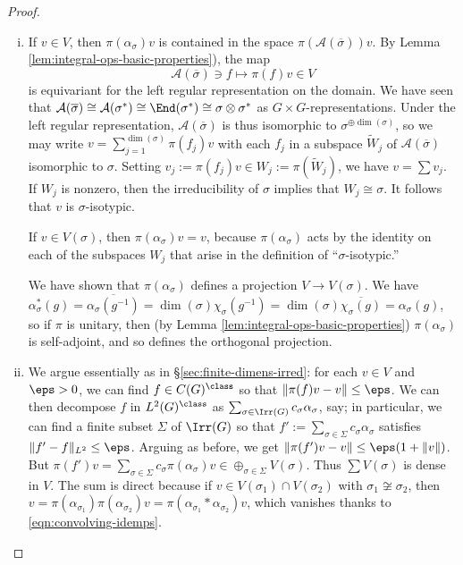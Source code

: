 \documentclass[reqno]{amsart} 
\begin{document}
\begin{proof}
  \begin{enumerate}
[(i)]
  \item If $v \in V$, then $\pi(\alpha_\sigma) v$ is contained in the space $\pi(\mathcal{A}(\overline{\sigma })) v$.  By Lemma \ref{lem:integral-ops-basic-properties}), the map
    \begin{equation*}
      \mathcal{A}(\overline{\sigma }) \ni f \mapsto \pi(f) v \in V
    \end{equation*}
    is equivariant for the left regular representation on the domain.  We have seen that $\mathcal{A}(\overline{\sigma }) \cong \mathcal{A}(\sigma ^*) \cong \End(\sigma^*) \cong \sigma \otimes \sigma^*$ as $G \times G$-representations.  Under the left regular representation, $\mathcal{A}(\overline{\sigma })$ is thus isomorphic to $\sigma^{\oplus \dim(\sigma)}$, so we may write $v = \sum_{j=1}^{\dim(\sigma)} \pi(f_j) v$ with each $f_j$ in a subspace $\tilde{W}_j$ of $\mathcal{A}(\overline{\sigma })$ isomorphic to $\sigma$.  Setting $v_j := \pi(f_j) v \in W_j := \pi(\tilde{W}_j)$, we have $v = \sum v_j$.  If $W_j$ is nonzero, then the irreducibility of $\sigma$ implies that $W_j \cong \sigma$.  It follows that $v$ is $\sigma$-isotypic.

    If $v \in V(\sigma)$, then $\pi(\alpha_\sigma) v = v$, because $\pi(\alpha_\sigma)$ acts by the identity on each of the subspaces $W_j$ that arise in the definition of ``$\sigma$-isotypic.''

    We have shown that $\pi(\alpha_\sigma)$ defines a projection $V \rightarrow V(\sigma)$.  We have $\alpha_\sigma^*(g) = \overline{\alpha_\sigma(g^{-1})} = \dim(\sigma) \chi_\sigma(g^{-1}) = \dim(\sigma) \overline{\chi_\sigma(g)} = \alpha_\sigma(g)$, so if $\pi$ is unitary, then (by Lemma \ref{lem:integral-ops-basic-properties}) $\pi(\alpha_\sigma)$ is self-adjoint, and so defines the orthogonal projection.
  \item We argue essentially as in \S\ref{sec:finite-dimens-irred}: for each $v \in V$ and $\eps > 0$, we can find $f \in C(G)^{\class}$ so that $\|\pi(f) v - v\| \leq \eps$.  We can then decompose $f$ in $L^2(G)^{\class}$ as $\sum_{\sigma \in \Irr(G)} c_\sigma \alpha_\sigma$, say; in particular, we can find a finite subset $\Sigma$ of $\Irr(G)$ so that $f' := \sum_{\sigma \in \Sigma} c_\sigma \alpha_\sigma$ satisfies $\|f' - f\|_{L^2} \leq \eps$.  Arguing as before, we get $\|\pi(f') v - v\| \leq \eps (1 + \|v\|)$.  But $\pi(f') v = \sum_{\sigma \in \Sigma} c_\sigma \pi(\alpha_\sigma) v \in \oplus_{\sigma \in \Sigma} V(\sigma)$.  Thus $\sum V(\sigma)$ is dense in $V$.  The sum is direct because if $v \in V(\sigma_1) \cap V(\sigma_2)$ with $\sigma_1 \not\cong \sigma_2$, then $v = \pi(\alpha_{\sigma_1}) \pi(\alpha_{\sigma_2}) v = \pi(\alpha_{\sigma_1} \ast \alpha_{\sigma_2}) v$, which vanishes thanks to \eqref{eqn:convolving-idemps}.
  \end{enumerate}
\end{proof}
\end{document}
